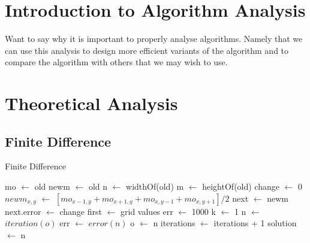 \documentclass{article}
\newcommand*\Let[2]{\State #1 $\gets$ #2}
\begin{document}
\section{Introduction to Algorithm Analysis}
Want to say why it is important to properly analyse algorithms. Namely that we can use this analysis to design more efficient variants of the algorithm and to compare the algorithm with others that we may wish to use.

\section{Theoretical Analysis}

\subsection{Finite Difference}
\begin{algorithm}
    \caption{Finite Difference}
    \label{alg:fd}
    \begin{algorithmic}[1]
            \Let{mo}{old}
            \Let{newm}{old}
            \Let{n}{widthOf(old)}
            \Let{m}{heightOf(old)}
            \Let{change}{0}
                        \Let{$newm_{x,y}$}{$[{mo_{x-1,y}+mo_{x+1,y}+mo_{x,y-1}+mo_{x,y+1}}] / {2}$}
                    \EndIf
                \EndFor
            \EndFor
            \Let{next}{newm}
            \Let{next.error}{change}
            \State {}
        \EndFunction
            \Let{first}{grid values}
            \Let{err}{1000}
            \Let{k}{1}
                \Let{n}{$iteration(o)$}
                \Let{err}{$error(n)$}
                \Let{o}{n}
                \Let{iterations}{iterations + 1}
            \EndWhile
            \Let{solution}{n}
            \State {}
        \EndFunction
    \end{algorithmic}
\end{algorithm}
\end{document}
